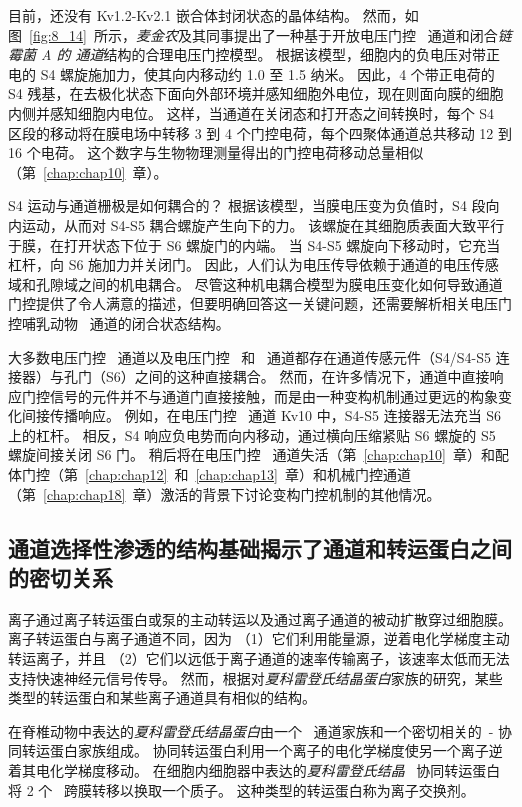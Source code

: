 目前，还没有 Kv1.2-Kv2.1 嵌合体封闭状态的晶体结构。
然而，如图~\ref{fig:8_14}~所示，\textit{麦金农}及其同事提出了一种基于开放电压门控~ 通道和闭合\textit{链霉菌 A 的  通道}结构的合理电压门控模型。
根据该模型，细胞内的负电压对带正电的 S4 螺旋施加力，使其向内移动约 1.0 至 1.5 纳米。
因此，4 个带正电荷的 S4 残基，在去极化状态下面向外部环境并感知细胞外电位，现在则面向膜的细胞内侧并感知细胞内电位。
这样，当通道在关闭态和打开态之间转换时，每个 S4 区段的移动将在膜电场中转移 3 到 4 个门控电荷，每个四聚体通道总共移动 12 到 16 个电荷。 
这个数字与生物物理测量得出的门控电荷移动总量相似（第~\ref{chap:chap10}~章）。


S4 运动与通道栅极是如何耦合的？
根据该模型，当膜电压变为负值时，S4 段向内运动，从而对 S4-S5 耦合螺旋产生向下的力。
该螺旋在其细胞质表面大致平行于膜，在打开状态下位于 S6 螺旋门的内端。
当 S4-S5 螺旋向下移动时，它充当杠杆，向 S6 施加力并关闭门。
因此，人们认为电压传导依赖于通道的电压传感域和孔隙域之间的机电耦合。
尽管这种机电耦合模型为膜电压变化如何导致通道门控提供了令人满意的描述，但要明确回答这一关键问题，还需要解析相关电压门控哺乳动物~ 通道的闭合状态结构。


大多数电压门控~ 通道以及电压门控~ 和~ 通道都存在通道传感元件（S4/S4-S5 连接器）与孔门（S6）之间的这种直接耦合。
然而，在许多情况下，通道中直接响应门控信号的元件并不与通道门直接接触，而是由一种变构机制通过更远的构象变化间接传播响应。
例如，在电压门控~ 通道 Kv10 中，S4-S5 连接器无法充当 S6 上的杠杆。
相反，S4 响应负电势而向内移动，通过横向压缩紧贴 S6 螺旋的 S5 螺旋间接关闭 S6 门。
稍后将在电压门控~ 通道失活（第~\ref{chap:chap10}~章）和配体门控（第~\ref{chap:chap12}~和~\ref{chap:chap13}~章）和机械门控通道（第~\ref{chap:chap18}~章）激活的背景下讨论变构门控机制的其他情况。



\subsection{通道选择性渗透的结构基础揭示了通道和转运蛋白之间的密切关系}

离子通过离子转运蛋白或泵的主动转运以及通过离子通道的被动扩散穿过细胞膜。
离子转运蛋白与离子通道不同，因为
（1）它们利用能量源，逆着电化学梯度主动转运离子，并且
（2）它们以远低于离子通道的速率传输离子，该速率太低而无法支持快速神经元信号传导。
然而，根据对\textit{夏科雷登氏结晶蛋白}家族的研究，某些类型的转运蛋白和某些离子通道具有相似的结构。


在脊椎动物中表达的\textit{夏科雷登氏结晶蛋白}由一个~ 通道家族和一个密切相关的~- 协同转运蛋白家族组成。
协同转运蛋白利用一个离子的电化学梯度使另一个离子逆着其电化学梯度移动。
在细胞内细胞器中表达的\textit{夏科雷登氏结晶}~ 协同转运蛋白将 2 个~ 跨膜转移以换取一个质子。
这种类型的转运蛋白称为离子交换剂。


